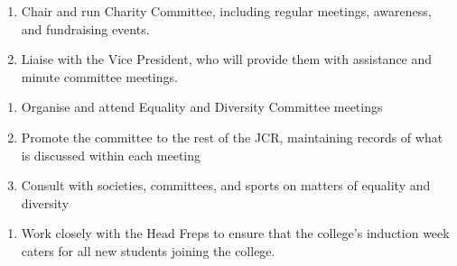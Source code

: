 \begin{enumerate}
    \item Chair and run Charity Committee, including regular meetings, awareness, and fundraising events.
    \item Liaise with the Vice President, who will provide them with assistance and minute committee meetings.
    
\end{enumerate}

\begin{enumerate}
    \item Organise and attend Equality and Diversity Committee meetings
    \item Promote the committee to the rest of the JCR, maintaining records of what is discussed within each meeting
    \item Consult with societies, committees, and sports on matters of equality and diversity
    
\end{enumerate}


\begin{enumerate}
    \item Work closely with the Head Freps to ensure that the college's induction week caters for all new students joining the college.
    
\end{enumerate}

